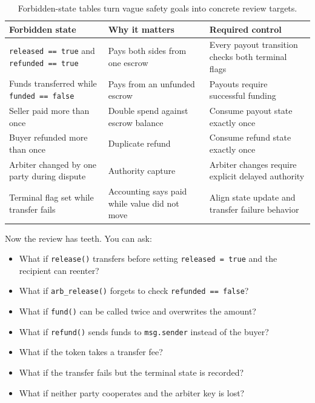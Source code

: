\begin{table}[htbp]
\centering
\small
\renewcommand{\arraystretch}{1.18}
\begin{tabularx}{\textwidth}{@{}>{\RaggedRight\arraybackslash}p{}>{\RaggedRight\arraybackslash}p{}X@{}}
\toprule
Forbidden state & Why it matters & Required control \\
\midrule
\texttt{released == true} and \texttt{refunded == true} & Pays both sides from one escrow & Every payout transition checks both terminal flags \\
Funds transferred while \texttt{funded == false} & Pays from an unfunded escrow & Payouts require successful funding \\
Seller paid more than once & Double spend against escrow balance & Consume payout state exactly once \\
Buyer refunded more than once & Duplicate refund & Consume refund state exactly once \\
Arbiter changed by one party during dispute & Authority capture & Arbiter changes require explicit delayed authority \\
Terminal flag set while transfer fails & Accounting says paid while value did not move & Align state update and transfer failure behavior \\
\bottomrule
\end{tabularx}
\caption{Forbidden-state tables turn vague safety goals into concrete review targets.}
\end{table}

Now the review has teeth. You can ask:

\begin{itemize}
\item What if \texttt{release()} transfers before setting \texttt{released = true} and the recipient can reenter?
\item What if \texttt{arb\_release()} forgets to check \texttt{refunded == false}?
\item What if \texttt{fund()} can be called twice and overwrites the amount?
\item What if \texttt{refund()} sends funds to \texttt{msg.sender} instead of the buyer?
\item What if the token takes a transfer fee?
\item What if the transfer fails but the terminal state is recorded?
\item What if neither party cooperates and the arbiter key is lost?
\end{itemize}

